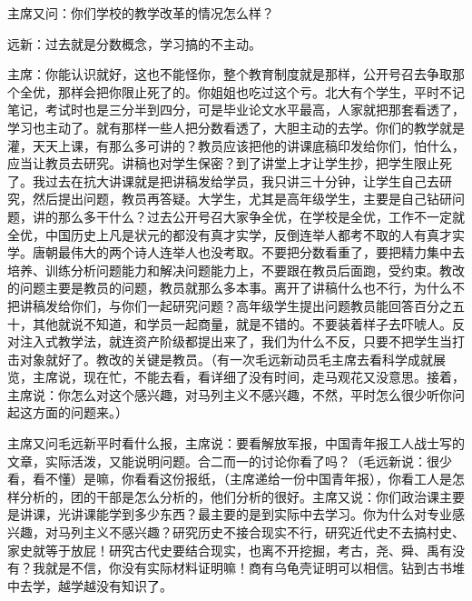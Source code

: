 主席又问：你们学校的教学改革的情况怎么样？

远新：过去就是分数概念，学习搞的不主动。

主席：你能认识就好，这也不能怪你，整个教育制度就是那样，公开号召去争取那个全优，那样会把你限止死了的。你姐姐也吃过这个亏。北大有个学生，平时不记笔记，考试时也是三分半到四分，可是毕业论文水平最高，人家就把那套看透了，学习也主动了。就有那样一些人把分数看透了，大胆主动的去学。你们的教学就是灌，天天上课，有那么多可讲的？教员应该把他的讲课底稿印发给你们，怕什么，应当让教员去研究。讲稿也对学生保密？到了讲堂上才让学生抄，把学生限止死了。我过去在抗大讲课就是把讲稿发给学员，我只讲三十分钟，让学生自己去研究，然后提出问题，教员再答疑。大学生，尤其是高年级学生，主要是自己钻研问题，讲的那么多干什么？过去公开号召大家争全优，在学校是全优，工作不一定就全优，中国历史上凡是状元的都没有真才实学，反倒连举人都考不取的人有真才实学。唐朝最伟大的两个诗人连举人也没考取。不要把分数看重了，要把精力集中去培养、训练分析问题能力和解决问题能力上，不要跟在教员后面跑，受约束。教改的问题主要是教员的问题，教员就那么多本事。离开了讲稿什么也不行，为什么不把讲稿发给你们，与你们一起研究问题？高年级学生提出问题教员能回答百分之五十，其他就说不知道，和学员一起商量，就是不错的。不要装着样子去吓唬人。反对注入式教学法，就连资产阶级都提出来了，我们为什么不反，只要不把学生当打击对象就好了。教改的关键是教员。（有一次毛远新动员毛主席去看科学成就展览，主席说，现在忙，不能去看，看详细了没有时间，走马观花又没意思。接着，主席说：你怎么对这个感兴趣，对马列主义不感兴趣，不然，平时怎么很少听你问起这方面的问题来。）

主席又问毛远新平时看什么报，主席说：要看解放军报，中国青年报工人战士写的文章，实际活泼，又能说明问题。合二而一的讨论你看了吗？（毛远新说：很少看，看不懂）是嘛，你看看这份报纸，（主席递给一份中国青年报），你看工人是怎样分析的，团的干部是怎么分析的，他们分析的很好。主席又说：你们政治课主要是讲课，光讲课能学到多少东西？最主要的是到实际中去学习。你为什么对专业感兴趣，对马列主义不感兴趣？研究历史不接合现实不行，研究近代史不去搞村史、家史就等于放屁！研究古代史要结合现实，也离不开挖掘，考古，尧、舜、禹有没有？我就是不信，你没有实际材料证明嘛！商有乌龟壳证明可以相信。钻到古书堆中去学，越学越没有知识了。


